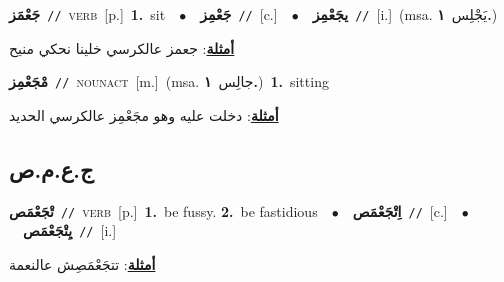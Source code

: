 \documentclass[10pt,a4paper,twoside]{article} %
\begin{document}
\begin{multicols}{2}
{\setlength\topsep{0pt}\textbf{\foreignlanguage{arabic}{جَعْمَز}}\ {\color{gray}\texttt{//}\color{black}}\ \textsc{verb}\ [p.]\ \textbf{1.}~sit\ \ $\bullet$\ \ \setlength\topsep{0pt}\textbf{\foreignlanguage{arabic}{جَعْمِز}}\ {\color{gray}\texttt{//}\color{black}}\ [c.]\ \ $\bullet$\ \ \setlength\topsep{0pt}\textbf{\foreignlanguage{arabic}{يجَعْمِز}}\ {\color{gray}\texttt{//}\color{black}}\ [i.]\ \color{gray}(msa. \foreignlanguage{arabic}{يَجْلِس}~\foreignlanguage{arabic}{\textbf{١.}})\color{black}\  \begin{flushright}\color{gray}\foreignlanguage{arabic}{\textbf{\underline{\foreignlanguage{arabic}{أمثلة}}}: جعمز عالكرسي خلينا نحكي منيح}\end{flushright}\color{black}} \vspace{2mm}

{\setlength\topsep{0pt}\textbf{\foreignlanguage{arabic}{مْجَعْمِز}}\ {\color{gray}\texttt{//}\color{black}}\ \textsc{noun\textunderscore act}\ [m.]\ \color{gray}(msa. \foreignlanguage{arabic}{جالِس}~\foreignlanguage{arabic}{\textbf{١.}})\color{black}\ \textbf{1.}~sitting\  \begin{flushright}\color{gray}\foreignlanguage{arabic}{\textbf{\underline{\foreignlanguage{arabic}{أمثلة}}}: دخلت عليه وهو مجَعْمِز عالكرسي الحديد}\end{flushright}\color{black}} \vspace{2mm}

\vspace{-3mm}
\subsection*{\color{blue}\foreignlanguage{arabic}{ج.ع.م.ص}\color{blue}{}} 

{\setlength\topsep{0pt}\textbf{\foreignlanguage{arabic}{تْجَعْمَص}}\ {\color{gray}\texttt{//}\color{black}}\ \textsc{verb}\ [p.]\ \textbf{1.}~be fussy.  \textbf{2.}~be fastidious\ \ $\bullet$\ \ \setlength\topsep{0pt}\textbf{\foreignlanguage{arabic}{اِتْجَعْمَص}}\ {\color{gray}\texttt{//}\color{black}}\ [c.]\ \ $\bullet$\ \ \setlength\topsep{0pt}\textbf{\foreignlanguage{arabic}{يِتْجَعْمَص}}\ {\color{gray}\texttt{//}\color{black}}\ [i.]\  \begin{flushright}\color{gray}\foreignlanguage{arabic}{\textbf{\underline{\foreignlanguage{arabic}{أمثلة}}}: تتجَعْمَصِش عالنعمة}\end{flushright}\color{black}} \vspace{2mm}


\end{multicols}
\end{document}
